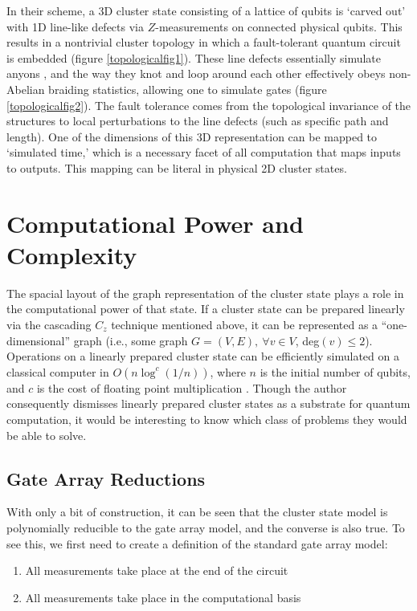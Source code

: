 \documentclass[twocolumn]{Styles/IEEEtran11}
\begin{document}
In their scheme, a 3D cluster state consisting of a lattice of qubits is `carved out' with 1D line-like defects via $Z$-measurements on connected physical qubits. This results in a nontrivial cluster topology in which a fault-tolerant quantum circuit is embedded (figure \ref{topologicalfig1}). These line defects essentially simulate anyons \cite{sarma2008}, and the way they knot and loop around each other effectively obeys non-Abelian braiding statistics, allowing one to simulate gates (figure \ref{topologicalfig2}). The fault tolerance comes from the topological invariance of the structures to local perturbations to the line defects (such as specific path and length). One of the dimensions of this 3D representation can be mapped to `simulated time,' which is a necessary facet of all computation that maps inputs to outputs. This mapping can be literal in physical 2D cluster states.

\section{Computational Power and Complexity}
The spacial layout of the graph representation of the cluster state plays a role in the computational power of that state. If a cluster state can be prepared linearly via the cascading $C_z$ technique mentioned above, it can be represented as a  ``one-dimensional'' graph (i.e., some graph $G=(V,E),\ \forall v\in V$, deg$(v)\leq 2$). Operations on a linearly prepared cluster state can be efficiently simulated on a classical computer in $O(n\log ^c (1/n))$, where $n$ is the initial number of qubits, and $c$ is the cost of floating point multiplication \cite{nielsen2006cluster}. Though the author consequently dismisses linearly prepared cluster states as a substrate for quantum computation, it would be interesting to know which class of problems they would be able to solve.

\subsection{Gate Array Reductions}


With only a bit of construction, it can be seen that the cluster state model is polynomially reducible to the gate array model, and the converse is also true. To see this, we first need to create a definition of the standard gate array model:

\vspace{1em}
\begin{enumerate}
\item All measurements take place at the end of the circuit
\item All measurements take place in the computational basis
\end{enumerate}
\end{document}
